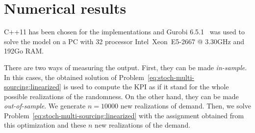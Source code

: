 \section{Numerical results}
\label{sec:multi-sourcing:numerical-experiments:numerical-results}




C++11 has been chosen for the implementations and Gurobi 6.5.1~\citet{gurobi} was used to solve the model on a PC with 32 processor Intel\textregistered\ Xeon\texttrademark\ E5-2667 @ 3.30GHz and 192Go RAM.


There are two ways of measuring the output.
First, they can be made \emph{in-sample}.
In this cases, the obtained solution of Problem~\eqref{eq:stoch-multi-sourcing:linearized} is used to compute the KPI as if it stand for the whole possible realizations of the randomness.
On the other hand, they can be made \emph{out-of-sample}.
We generate $n=10000$ new realizations of demand.
Then, we solve Problem~\eqref{eq:stoch-multi-sourcing:linearized} with the assignment obtained from this optimization and these $n$ new realizations of the demand.
